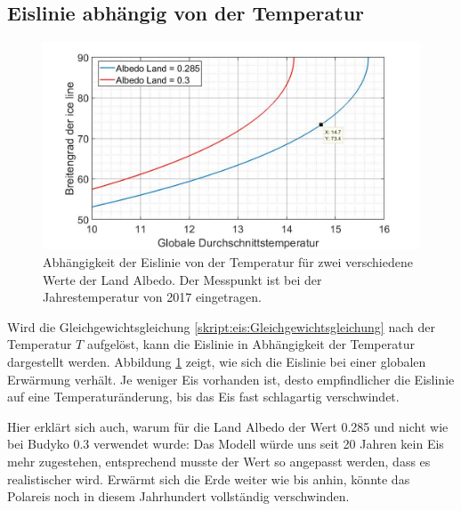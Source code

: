 \begin{refsection}
\subsection{Eislinie abhängig von der Temperatur}
\begin{figure}
	\centering
	\includegraphics[width=14cm]{eis/iceline_abh_von_der_Temperatur_mit_Verleich_albedo_0,3.jpg}
	\caption{Abhängigkeit der Eislinie von der Temperatur für zwei verschiedene Werte der Land Albedo. Der Messpunkt ist bei der Jahrestemperatur von 2017 eingetragen.}
	\label{skript:eis:fig:iceline_abh_von_der_Temperatur}
\end{figure}
Wird die Gleichgewichtsgleichung \eqref{skript:eis:Gleichgewichtsgleichung} nach der Temperatur $T$ aufgelöst, kann die Eislinie in Abhängigkeit der Temperatur dargestellt werden. Abbildung \ref{skript:eis:fig:iceline_abh_von_der_Temperatur} zeigt, wie sich die Eislinie bei einer globalen Erwärmung verhält. Je weniger Eis vorhanden ist, desto empfindlicher die Eislinie auf eine Temperaturänderung, bis das Eis fast schlagartig verschwindet.

Hier erklärt sich auch, warum für die Land Albedo der Wert 0.285 und nicht wie bei Budyko 0.3 verwendet wurde: Das Modell würde uns seit 20 Jahren kein Eis mehr zugestehen, entsprechend musste der Wert so angepasst werden, dass es realistischer wird. Erwärmt sich die Erde weiter wie bis anhin, könnte das Polareis noch in diesem Jahrhundert vollständig verschwinden.

\end{refsection}
